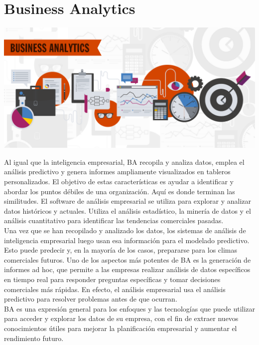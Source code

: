 \section{Business Analytics} 

\vspace{16mm} %
\begin{center}
\includegraphics[width=17cm]{./Imagenes/002}
\end{center}	
\vspace{12mm} %

Al igual que la inteligencia empresarial, BA recopila y analiza datos, emplea el análisis predictivo y genera informes ampliamente visualizados en tableros personalizados. El objetivo de estas características es ayudar a identificar y abordar los puntos débiles de una organización. Aquí es donde terminan las similitudes. El software de análisis empresarial se utiliza para explorar y analizar datos históricos y actuales. Utiliza el análisis estadístico, la minería de datos y el análisis cuantitativo para identificar las tendencias comerciales pasadas.\\
Una vez que se han recopilado y analizado los datos, los sistemas de análisis de inteligencia empresarial luego usan esa información para el modelado predictivo. Esto puede predecir y, en la mayoría de los casos, prepararse para los climas comerciales futuros. Uno de los aspectos más potentes de BA es la generación de informes ad hoc, que permite a las empresas realizar análisis de datos específicos en tiempo real para responder preguntas específicas y tomar decisiones comerciales más rápidas. En efecto, el análisis empresarial usa el análisis predictivo para resolver problemas antes de que ocurran.\\
BA es una expresión general para los enfoques y las tecnologías que puede utilizar para acceder y explorar los datos de su empresa, con el fin de extraer nuevos conocimientos útiles para mejorar la planificación empresarial y aumentar el rendimiento futuro.

